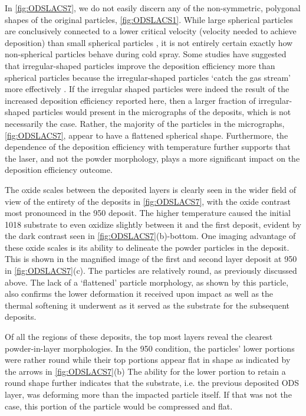 	In \ref{fig:ODSLACS7}, we do not easily discern any of the non-symmetric, polygonal shapes of the original particles, \ref{fig:ODSLACS1}. While large spherical particles are conclusively connected to a lower critical velocity (velocity needed to achieve deposition) than small spherical particles \cite{RN3458}, it is not entirely certain exactly how non-spherical particles behave during cold spray. Some studies have suggested that irregular-shaped particles improve the deposition efficiency more than spherical particles because the irregular-shaped particles ‘catch the gas stream’ more effectively \cite{RN511,RN3428}. If the irregular shaped particles were indeed the result of the increased deposition efficiency reported here, then a larger fraction of irregular-shaped particles would present in the micrographs of the deposits, which is not necessarily the case. Rather, the majority of the particles in the micrographs, \ref{fig:ODSLACS7}, appear to have a flattened spherical shape. Furthermore, the dependence of the deposition efficiency with temperature further supports that the laser, and not the powder morphology, plays a more significant impact on the deposition efficiency outcome. 



	 The oxide scales between the deposited layers is clearly seen in the wider field of view of the entirety of the deposits in \ref{fig:ODSLACS7}, with the oxide contrast most pronounced in the 950 \celsius{} deposit. The higher temperature caused the initial 1018 substrate to even oxidize slightly between it and the first deposit, evident by the dark contrast seen in \ref{fig:ODSLACS7}(b)-bottom. One imaging advantage of these oxide scales is its ability to delineate the powder particles in the deposit. This is shown in the magnified image of the first and second layer deposit at 950 \celsius{} in \ref{fig:ODSLACS7}(c). The particles are relatively round, as previously discussed above. The lack of a ‘flattened’ particle morphology, as shown by this particle, also confirms the lower deformation it received upon impact as well as the thermal softening it underwent as it served as the substrate for the subsequent deposits. 



	Of all the regions of these deposits, the top most layers reveal the clearest powder-in-layer morphologies. In the 950 \celsius{} condition, the particles’ lower portions were rather round while their top portions appear flat in shape as indicated by the arrows in \ref{fig:ODSLACS7}(b) The ability for the lower portion to retain a round shape further indicates that the substrate, i.e. the previous deposited ODS layer, was deforming more than the impacted particle itself. If that was not the case, this portion of the particle would be compressed and flat. 



